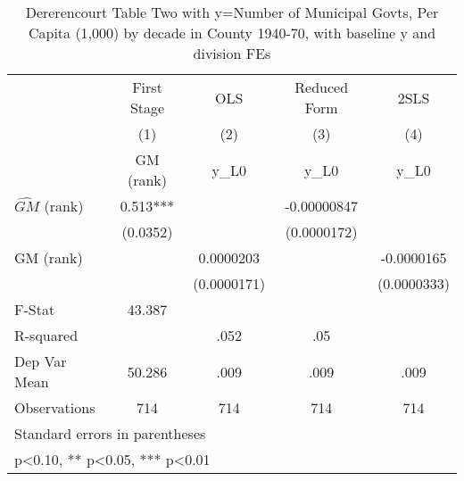 \begin{table}[htbp]\centering
\def\sym#1{\ifmmode^{#1}\else\(^{#1}\)\fi}
\caption{Dererencourt Table Two with y=Number of Municipal Govts, Per Capita (1,000) by decade in County 1940-70, with baseline y and division FEs}
\begin{tabular}{l*{4}{c}}
\toprule
                    & First Stage   &         OLS   &Reduced Form   &        2SLS   \\
                    &\multicolumn{1}{c}{(1)}&\multicolumn{1}{c}{(2)}&\multicolumn{1}{c}{(3)}&\multicolumn{1}{c}{(4)}\\
                    &\multicolumn{1}{c}{GM  (rank)}&\multicolumn{1}{c}{y\_L0}&\multicolumn{1}{c}{y\_L0}&\multicolumn{1}{c}{y\_L0}\\
\midrule
$\hat{GM}$ (rank)   &       0.513***&               & -0.00000847   &               \\
                    &    (0.0352)   &               & (0.0000172)   &               \\
\addlinespace
GM  (rank)          &               &   0.0000203   &               &  -0.0000165   \\
                    &               & (0.0000171)   &               & (0.0000333)   \\
\midrule
F-Stat              &      43.387   &               &               &               \\
R-squared           &               &        .052   &         .05   &               \\
Dep Var Mean        &      50.286   &        .009   &        .009   &        .009   \\
Observations        &         714   &         714   &         714   &         714   \\
\bottomrule
\multicolumn{5}{l}{\footnotesize Standard errors in parentheses}\\
\multicolumn{5}{l}{\footnotesize * p<0.10, ** p<0.05, *** p<0.01}\\
\end{tabular}
\end{table}
